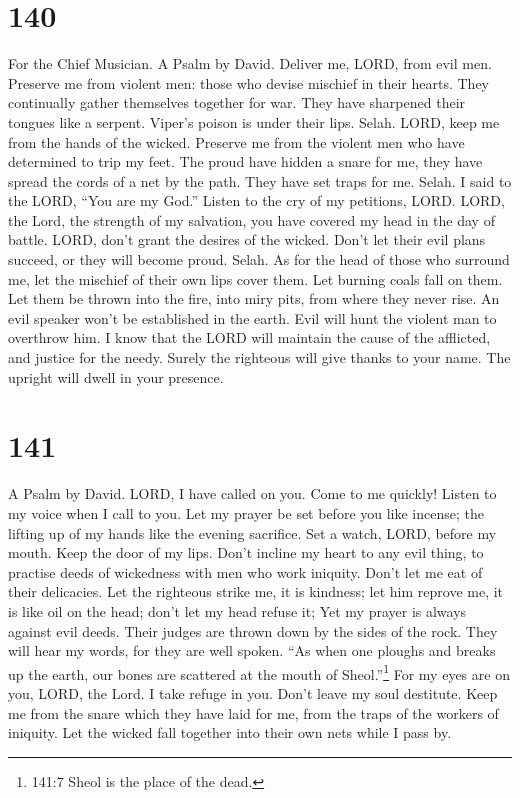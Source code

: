 \hypertarget{section-132}{%
\section{140}\label{section-132}}

For the Chief Musician. A Psalm by David.  Deliver me, LORD,
from evil men. Preserve me from violent men:  those who
devise mischief in their hearts. They continually gather themselves
together for war.  They have sharpened their tongues like a
serpent. Viper's poison is under their lips. Selah.  LORD,
keep me from the hands of the wicked. Preserve me from the violent men
who have determined to trip my feet.  The proud have hidden
a snare for me, they have spread the cords of a net by the path. They
have set traps for me. Selah.  I said to the LORD, ``You are
my God.'' Listen to the cry of my petitions, LORD.  LORD,
the Lord, the strength of my salvation, you have covered my head in the
day of battle.  LORD, don't grant the desires of the wicked.
Don't let their evil plans succeed, or they will become proud. Selah.
 As for the head of those who surround me, let the mischief
of their own lips cover them.  Let burning coals fall on
them. Let them be thrown into the fire, into miry pits, from where they
never rise.  An evil speaker won't be established in the
earth. Evil will hunt the violent man to overthrow him.  I
know that the LORD will maintain the cause of the afflicted, and justice
for the needy.  Surely the righteous will give thanks to
your name. The upright will dwell in your presence.

\hypertarget{section-133}{%
\section{141}\label{section-133}}

A Psalm by David.  LORD, I have called on you. Come to me
quickly! Listen to my voice when I call to you.  Let my
prayer be set before you like incense; the lifting up of my hands like
the evening sacrifice.  Set a watch, LORD, before my mouth.
Keep the door of my lips.  Don't incline my heart to any
evil thing, to practise deeds of wickedness with men who work iniquity.
Don't let me eat of their delicacies.  Let the righteous
strike me, it is kindness; let him reprove me, it is like oil on the
head; don't let my head refuse it; Yet my prayer is always against evil
deeds.  Their judges are thrown down by the sides of the
rock. They will hear my words, for they are well spoken. 
``As when one ploughs and breaks up the earth, our bones are scattered
at the mouth of Sheol.''\footnote{141:7 Sheol is the place of the dead.}
 For my eyes are on you, LORD, the Lord. I take refuge in
you. Don't leave my soul destitute.  Keep me from the snare
which they have laid for me, from the traps of the workers of iniquity.
 Let the wicked fall together into their own nets while I
pass by.

